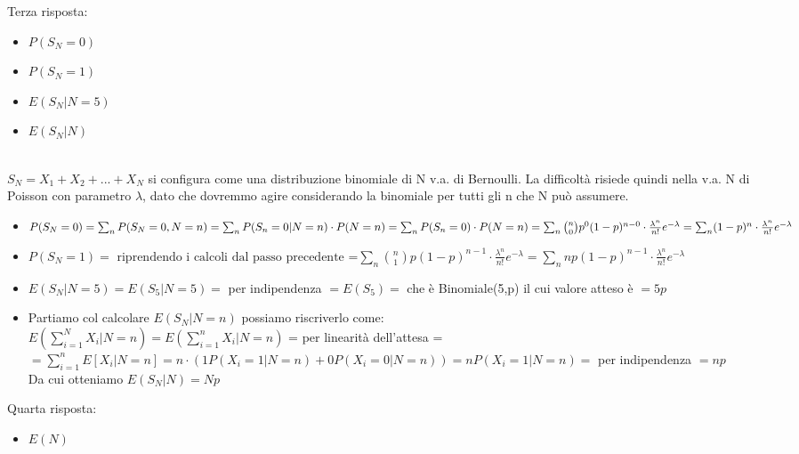 \documentclass{oxmathproblems}
\begin{document}
\begin{questions}
\miquestion
Terza risposta: 
\begin{itemize}
    \item $P(S_N=0)$
    \item $P(S_N=1)$
    \item $E(S_N|N=5)$
    \item $E(S_N|N)$
\end{itemize}

\begin{solution}
    \\
    $S_N = X_1 + X_2+...+X_N$ si configura come una distribuzione binomiale di N v.a. di Bernoulli.
    La difficoltà risiede quindi nella v.a. N di Poisson con parametro $\lambda$, dato che dovremmo agire considerando la binomiale per tutti gli n che N può assumere.\\
    \begin{itemize}
        \item $P(S_N=0)= \sum_{n} P(S\sb{N} = 0, N = n) = \sum_{n}  P(S\sb{n} = 0 | N = n)\cdot P (N = n) = \sum_{n} P (S\sb{n} = 0) \cdot P (N = n) = \sum_{n}\binom{n}{0}p^0(1-p)^{n-0}\cdot\frac{\lambda^n}{n!}e^{-\lambda}=\sum_{n}(1-p)^{n}\cdot\frac{\lambda^n}{n!}e^{-\lambda}$
        \item $P(S_N=1)= \text{ riprendendo i calcoli dal passo precedente =}\sum_{n}\binom{n}{1}p(1-p)^{n-1}\cdot\frac{\lambda^n}{n!}e^{-\lambda}=\sum_{n}np(1-p)^{n-1}\cdot\frac{\lambda^n}{n!}e^{-\lambda}$
        \item $E(S_N|N=5)=E(S_5|N=5)=$ per indipendenza $=E(S_5)=$ che è Binomiale(5,p) il cui valore atteso è $=5p$
        \item Partiamo col calcolare $E(S_N|N=n)$ possiamo riscriverlo come: \\
        $E(\sum_{i=1}^N X_i|N=n)=E(\sum_{i=1}^n X_i|N=n)$  = per linearità dell'attesa = \\ $=\sum_{i=1}^nE[X_i|N=n]=n\cdot(1P(X_i=1|N=n)+0P(X_i=0|N=n))=nP(X_i=1|N=n)=$ per indipendenza $=np$\\
        Da cui otteniamo $E(S_N|N)=Np$
    \end{itemize}
\end{solution}

\miquestion
Quarta risposta:
\begin{itemize}
    \item $E(N)$
\end{itemize}


\end{questions}
\end{document}
